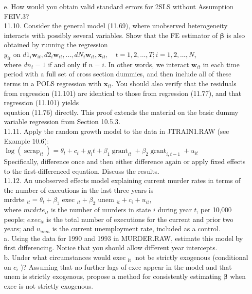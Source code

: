\documentclass[10pt]{article}
\begin{document}
e. How would you obtain valid standard errors for 2SLS without Assumption FEIV.3?\\
11.10. Consider the general model (11.69), where unobserved heterogeneity interacts with possibly several variables. Show that the FE estimator of $\boldsymbol{\beta}$ is also obtained by running the regression\\
$y_{i t}$ on $d 1_{i} \mathbf{w}_{i t}, d 2_{i} \mathbf{w}_{i t}, \ldots, d N_{i} \mathbf{w}_{i t}, \mathbf{x}_{i t}, \quad t=1,2, \ldots, T ; i=1,2, \ldots, N$,\\
where $d n_{i}=1$ if and only if $n=i$. In other words, we interact $\mathbf{w}_{i t}$ in each time period with a full set of cross section dummies, and then include all of these terms in a POLS regression with $\mathbf{x}_{i t}$. You should also verify that the residuals from regression (11.101) are identical to those from regression (11.77), and that regression (11.101) yields\\
equation (11.76) directly. This proof extends the material on the basic dummy variable regression from Section 10.5.3.\\
11.11. Apply the random growth model to the data in JTRAIN1.RAW (see Example 10.6):\\
$\log \left(\operatorname{scrap}_{i t}\right)=\theta_{t}+c_{i}+g_{i} t+\beta_{1} \operatorname{grant}_{i t}+\beta_{2} \operatorname{grant}_{i, t-1}+u_{i t}$\\
Specifically, difference once and then either difference again or apply fixed effects to the first-differenced equation. Discuss the results.\\
11.12. An unobserved effects model explaining current murder rates in terms of the number of executions in the last three years is\\
mrdrte $_{i t}=\theta_{t}+\beta_{1}$ exec $_{i t}+\beta_{2}$ unem $_{i t}+c_{i}+u_{i t}$,\\
where $m r d r t e_{i t}$ is the number of murders in state $i$ during year $t$, per 10,000 people; $e x e c_{i t}$ is the total number of executions for the current and prior two years; and $u_{n e m}$ is the current unemployment rate, included as a control.\\
a. Using the data for 1990 and 1993 in MURDER.RAW, estimate this model by first differencing. Notice that you should allow different year intercepts.\\
b. Under what circumstances would exec $_{\text {it }}$ not be strictly exogenous (conditional on $c_{i}$ )? Assuming that no further lags of exec appear in the model and that unem is strictly exogenous, propose a method for consistently estimating $\boldsymbol{\beta}$ when exec is not strictly exogenous.\\
\end{document}
